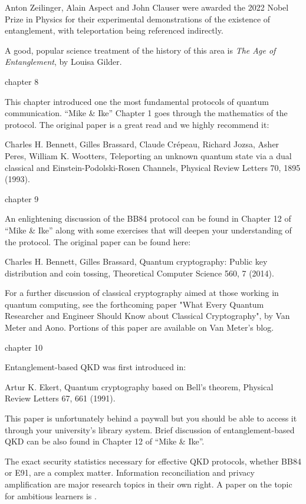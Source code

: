Anton Zeilinger, Alain Aspect and John Clauser were awarded the 2022 Nobel Prize in Physics for their experimental demonstrations of the existence of entanglement, with teleportation being referenced indirectly.

A good, popular science treatment of the history of this area is \emph{The Age of Entanglement}, by Louisa Gilder.

chapter 8

This chapter introduced one the most fundamental protocols of quantum communication. “Mike \& Ike” Chapter 1 goes through the mathematics of the protocol. The original paper is a great read and we highly recommend it:

Charles H. Bennett, Gilles Brassard, Claude Crépeau, Richard Jozsa, Asher Peres, William K. Wootters, Teleporting an unknown quantum state via a dual classical and Einstein-Podolski-Rosen Channels, Physical Review Letters 70, 1895 (1993).

chapter 9

An enlightening discussion of the BB84 protocol can be found in Chapter 12 of “Mike \& Ike” along with some exercises that will deepen your understanding of the protocol.
The original paper can be found here:

Charles H. Bennett, Gilles Brassard, Quantum cryptography: Public key distribution and coin tossing, Theoretical Computer Science 560, 7 (2014).

For a further discussion of classical cryptography aimed at those working in quantum computing, see the forthcoming paper "What Every Quantum Researcher and Engineer Should Know about Classical Cryptography", by Van Meter and Aono.  Portions of this paper are available on Van Meter's blog.

chapter 10

Entanglement-based QKD was first introduced in:

Artur K. Ekert, Quantum cryptography based on Bell’s theorem, Physical Review Letters 67, 661 (1991).

This paper is unfortunately behind a paywall but you should be able to access it through your university’s library system.
Brief discussion of entanglement-based QKD can be also found in Chapter 12 of “Mike \& Ike”.

The exact security statistics necessary for effective QKD protocols, whether BB84 or E91, are a complex matter.  Information reconciliation and privacy amplification are major research topics in their own right. A paper on the topic for ambitious learners is .